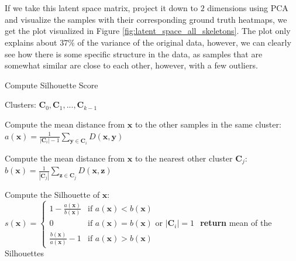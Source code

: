 \documentclass[./main.tex]{subfiles}
\begin{document}
\\
\\
If we take this latent space matrix, project it down to $2$ dimensions using PCA and visualize the samples with their corresponding ground truth heatmaps, we get the plot visualized in Figure \ref{fig:latent_space_all_skeletons}. The plot only explains about $37\%$ of the variance of the original data, however, we can clearly see how there is some specific structure in the data, as samples that are somewhat similar are close to each other, however, with a few outliers.
\\
\begin{algorithm}[t]
    \caption{Compute Silhouette Score \cite{MAD_L12}}
    \label{Algorithm:Silhouette_score}
    \begin{algorithmic}[1]
        \Require Clusters: $\bm{C}_0, \bm{C}_1, ..., \bm{C}_{k - 1}$
                \State \begin{varwidth}[t]{\linewidth}
                    Compute the mean distance from $\bm{x}$ to the other samples in the same cluster: $a(\bm{x}) = \frac{1}{|\bm{C}_i| - 1} \sum_{\bm{y} \in \bm{C}_i} D(\bm{x}, \bm{y})$
                \end{varwidth}
                \State \begin{varwidth}[t]{\linewidth}
                Compute the mean distance from $\bm{x}$ to the nearest other cluster $\bm{C}_j$: $b(\bm{x}) = \frac{1}{| \bm{C}_j |} \sum_{\bm{z} \in \bm{C}_j} D(\bm{x}, \bm{z})$
                \end{varwidth}
                \State Compute the Silhouette of $\bm{x}$:
                \begin{math}
                    s(\bm{x}) =
                    \begin{cases}
                        1 - \frac{a(\bm{x})}{b(\bm{x})} & \text{if } a(\bm{x}) < b(\bm{x}) \\
                        0 & \text{if } a(\bm{x}) = b(\bm{x}) \text{ or } |\bm{C}_i| = 1 \\
                        \frac{b(\bm{x})}{a(\bm{x})} - 1 & \text{if } a(\bm{x}) > b(\bm{x})
                    \end{cases}
                \end{math}
            \EndFor
        \EndFor
        \State \textbf{return} mean of the Silhouettes
    \end{algorithmic}
\end{algorithm}
\end{document}
